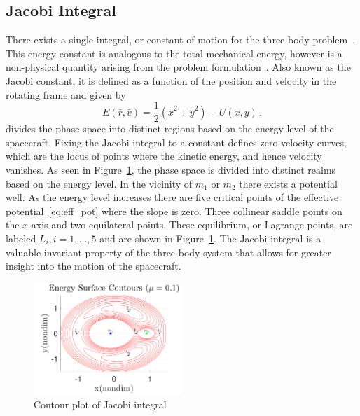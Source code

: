 \documentclass[preprint]{elsarticle}
\begin{document}
\subsection{Jacobi Integral}\label{sec:jacobi}
There exists a single integral, or constant of motion for the three-body problem~\cite{lanczos1970,szebehely1967}.
This energy constant is analogous to the total mechanical energy, however is a non-physical quantity arising from the problem formulation~\cite{szebehely1967}.
Also known as the Jacobi constant, it is defined as a function of the position and velocity in the rotating frame and given by
\begin{equation}
	E\left( \bar{r} , \bar{v} \right) = \frac{1}{2}\left( \dot{x}^2 + \dot{y}^2\right) - U\left(x,y \right) \, .
	\label{eq:jacobi}
\end{equation}
 divides the phase space into distinct regions based on the energy level of the spacecraft.
Fixing the Jacobi integral to a constant defines zero velocity curves, which are the locus of points where the kinetic energy, and hence velocity vanishes.
As seen in Figure~\ref{fig:energy_contour}, the phase space is divided into distinct realms based on the energy level.
In the vicinity of \( m_1\) or \(m_2\) there exists a potential well. 
As the energy level increases there are five critical points of the effective potential~\cref{eq:eff_pot} where the slope is zero.
Three collinear saddle points on the \(x\) axis and two equilateral points.
These equilibrium, or Lagrange points, are labeled \( L_i, i = 1, \hdots, 5 \) and are shown in Figure~\ref{fig:energy_contour}.
The Jacobi integral is a valuable invariant property of the three-body system that allows for greater insight into the motion of the spacecraft.
\begin{figure}[htbp]
	\centering
	\includegraphics[width=0.5\textwidth]{energy_contours}
	\caption{Contour plot of Jacobi integral}
	\label{fig:energy_contour}
\end{figure} 
\end{document}
